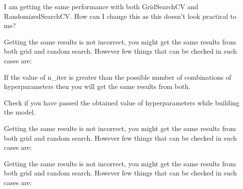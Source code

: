 	\begin{qanda}
		\begin{question}
I am getting the same performance with both GridSearchCV and RandomizedSearchCV.  How can I change this as this doesn't look practical to me?
		\end{question}

		\begin{answer}
Getting the same results is not incorrect, you might get the same results from both grid and random search.  However few things that can be checked in such cases are:
	\begin{bulletedlist}
		\item If the value of n\_iter is greater than the possible number of combinations of hyperparameters then you will get the same results from both.
		\item Check if you have passed the obtained value of hyperparameters while building the model.
	\end{bulletedlist}

Getting the same results is not incorrect, you might get the same results from both grid and random search.  However few things that can be checked in such cases are:

Getting the same results is not incorrect, you might get the same results from both grid and random search.  However few things that can be checked in such cases are:
		\end{answer}
	\end{qanda} 